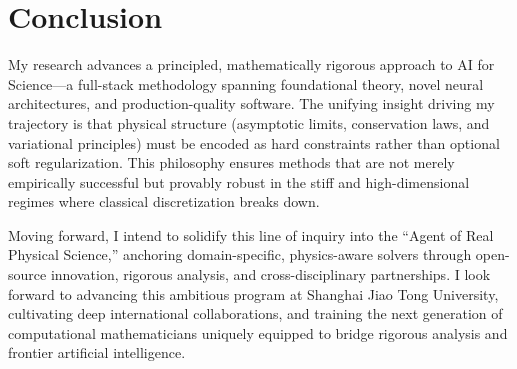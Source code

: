 \section{Conclusion}

My research advances a principled, mathematically rigorous approach to AI for
Science---a full-stack methodology spanning foundational theory, novel neural
architectures, and production-quality software. The unifying insight driving
my trajectory is that physical structure (asymptotic limits, conservation
laws, and variational principles) must be encoded as hard constraints rather
than optional soft regularization. This philosophy ensures methods that are not
merely empirically successful but provably robust in the stiff and high-dimensional
regimes where classical discretization breaks down.

Moving forward, I intend to solidify this line of inquiry into the
``Agent of Real Physical Science,'' anchoring domain-specific, physics-aware
solvers through open-source innovation, rigorous analysis, and cross-disciplinary
partnerships. I look forward to advancing this ambitious program at Shanghai Jiao
Tong University, cultivating deep international collaborations, and training the
next generation of computational mathematicians uniquely equipped to bridge
rigorous analysis and frontier artificial intelligence.
